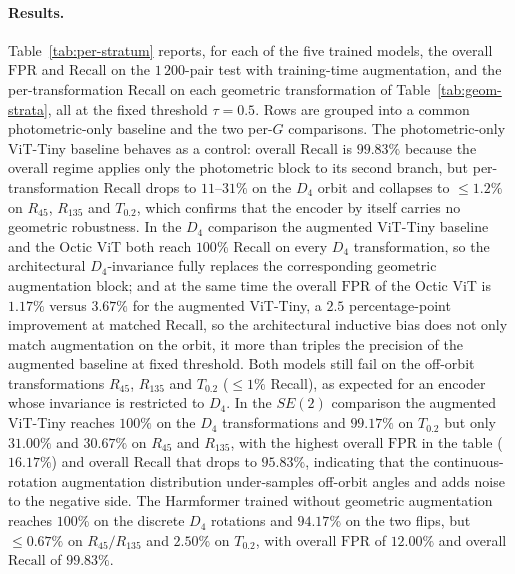 \documentclass{article}
\begin{document}
\paragraph{Results.} Table~\ref{tab:per-stratum} reports, for each of the five trained models, the overall $\mathrm{FPR}$ and $\mathrm{Recall}$ on the $1\,200$-pair test with training-time augmentation, and the per-transformation $\mathrm{Recall}$ on each geometric transformation of Table~\ref{tab:geom-strata}, all at the fixed threshold $\tau = 0.5$. Rows are grouped into a common photometric-only baseline and the two per-$G$ comparisons. The photometric-only ViT-Tiny baseline behaves as a control: overall $\mathrm{Recall}$ is $99.83\%$ because the overall regime applies only the photometric block to its second branch, but per-transformation $\mathrm{Recall}$ drops to $11$--$31\%$ on the $D_4$ orbit and collapses to $\le 1.2\%$ on $R_{45}$, $R_{135}$ and $T_{0.2}$, which confirms that the encoder by itself carries no geometric robustness. In the $D_4$ comparison the augmented ViT-Tiny baseline and the Octic ViT both reach $100\%$ Recall on every $D_4$ transformation, so the architectural $D_4$-invariance fully replaces the corresponding geometric augmentation block; and at the same time the overall $\mathrm{FPR}$ of the Octic ViT is $1.17\%$ versus $3.67\%$ for the augmented ViT-Tiny, a $2.5$ percentage-point improvement at matched $\mathrm{Recall}$, so the architectural inductive bias does not only match augmentation on the orbit, it more than triples the precision of the augmented baseline at fixed threshold. Both models still fail on the off-orbit transformations $R_{45}$, $R_{135}$ and $T_{0.2}$ ($\le 1\%$ Recall), as expected for an encoder whose invariance is restricted to $D_4$. In the $SE(2)$ comparison the augmented ViT-Tiny reaches $100\%$ on the $D_4$ transformations and $99.17\%$ on $T_{0.2}$ but only $31.00\%$ and $30.67\%$ on $R_{45}$ and $R_{135}$, with the highest overall $\mathrm{FPR}$ in the table ($16.17\%$) and overall $\mathrm{Recall}$ that drops to $95.83\%$, indicating that the continuous-rotation augmentation distribution under-samples off-orbit angles and adds noise to the negative side. The Harmformer trained without geometric augmentation reaches $100\%$ on the discrete $D_4$ rotations and $94.17\%$ on the two flips, but $\le 0.67\%$ on $R_{45}/R_{135}$ and $2.50\%$ on $T_{0.2}$, with overall $\mathrm{FPR}$ of $12.00\%$ and overall $\mathrm{Recall}$ of $99.83\%$.
\end{document}
